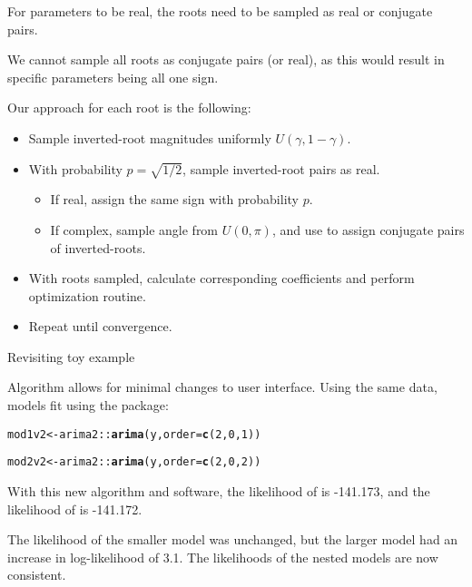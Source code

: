 \documentclass[aspectratio=169]{beamer}\usepackage[]{graphicx}\usepackage[]{xcolor}
\makeatletter
\newcommand{\hlnum}[1]{\textcolor[rgb]{0.686,0.059,0.569}{#1}}%
\newcommand{\hlopt}[1]{\textcolor[rgb]{0,0,0}{#1}}%
\newcommand{\hldef}[1]{\textcolor[rgb]{0.345,0.345,0.345}{#1}}%
\newcommand{\hlkwb}[1]{\textcolor[rgb]{0.69,0.353,0.396}{#1}}%
\newcommand{\hlkwc}[1]{\textcolor[rgb]{0.333,0.667,0.333}{#1}}%
\newcommand{\hlkwd}[1]{\textcolor[rgb]{0.737,0.353,0.396}{\textbf{#1}}}%
\newenvironment{kframe}{%
 \def\at@end@of@kframe{}%
 \ifinner\ifhmode%
  \def\at@end@of@kframe{\end{minipage}}%
  \begin{minipage}{\columnwidth}%
 \fi\fi%
 \def\FrameCommand##1{\hskip\@totalleftmargin \hskip-\fboxsep
 \colorbox{shadecolor}{##1}\hskip-\fboxsep
     \hskip-\linewidth \hskip-\@totalleftmargin \hskip\columnwidth}%
 \MakeFramed {\advance\hsize-\width
   \@totalleftmargin\z@ \linewidth\hsize
   \@setminipage}}%
 {\par\unskip\endMakeFramed%
 \at@end@of@kframe}
\newenvironment{knitrout}{}{} %
\makeatother
\begin{document}
\begin{frame}
  For parameters to be real, the roots need to be sampled as real or conjugate pairs. 
  
  We cannot sample all roots as conjugate pairs (or real), as this would result in specific parameters being all one sign. 
  
  Our approach for each root is the following:
  \begin{itemize}
    \item Sample inverted-root magnitudes uniformly $U(\gamma, 1-\gamma)$.
    \item With probability $p = \sqrt{1/2}$, sample inverted-root pairs as real.
    \begin{itemize}
      \item If real, assign the same sign with probability $p$.
      \item If complex, sample angle from $U(0, \pi)$, and use to assign conjugate pairs of inverted-roots.
    \end{itemize}
    \item With roots sampled, calculate corresponding coefficients and perform optimization routine.
    \item Repeat until convergence.
  \end{itemize}
\end{frame}

\begin{frame}{Revisiting toy example}

Algorithm allows for minimal changes to user interface.
Using the same data, models fit using the  package:



\begin{knitrout}
\color{fgcolor}\begin{kframe}
\begin{alltt}
\hldef{mod1v2} \hlkwb{<-} \hldef{arima2}\hlopt{::}\hlkwd{arima}\hldef{(y,} \hlkwc{order} \hldef{=} \hlkwd{c}\hldef{(}\hlnum{2}\hldef{,} \hlnum{0}\hldef{,} \hlnum{1}\hldef{))}

\hldef{mod2v2} \hlkwb{<-} \hldef{arima2}\hlopt{::}\hlkwd{arima}\hldef{(y,} \hlkwc{order} \hldef{=} \hlkwd{c}\hldef{(}\hlnum{2}\hldef{,} \hlnum{0}\hldef{,} \hlnum{2}\hldef{))}
\end{alltt}
\end{kframe}
\end{knitrout}

With this new algorithm and software, the likelihood of  is -141.173, and the likelihood of  is -141.172.

\pause
The likelihood of the smaller model was unchanged, but the larger model had an increase in log-likelihood of 3.1. The likelihoods of the nested models are now \alert{consistent}.
\end{frame}
\end{document}
